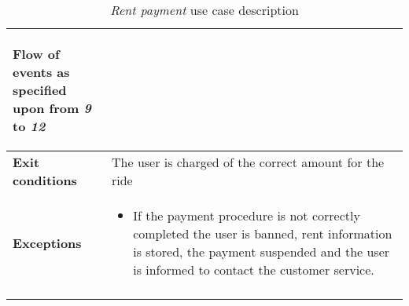 \begin{longtable}{p{0.25\linewidth}p{0.75\linewidth}}
\begin{enumerate}[label=8 \alph*.]
\end{enumerate}
Flow of events as specified upon from \emph{9} to \emph{12} \\
\midrule
\textbf{Exit conditions} & 
The user is charged of the correct amount for the ride\\
\midrule
\textbf{Exceptions} & 
\begin{itemize}
	\item If the payment procedure is not correctly completed the user is banned, rent information is stored, the payment suspended and the user is informed to contact the customer service.  
\end{itemize} \\
\bottomrule
\caption{\emph{Rent payment} use case description}
\end{longtable}

\clearpage
